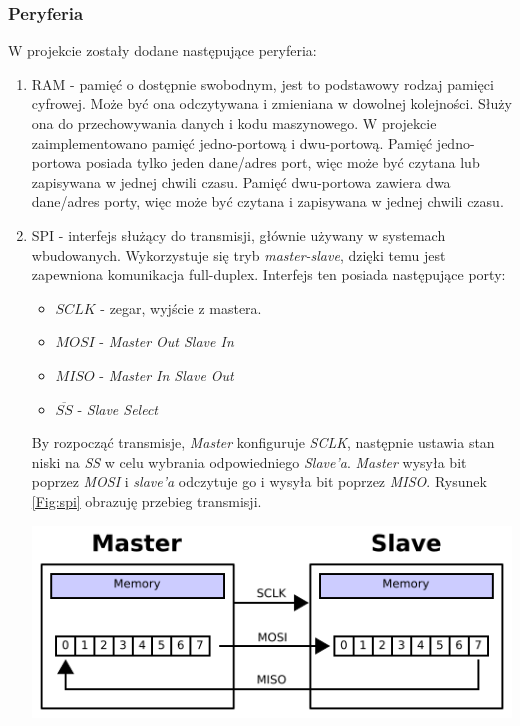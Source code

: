\documentclass[11pt,a4paper]{article}
\begin{document}
		\subsubsection{Peryferia}
		\hspace{5mm}
			W projekcie zostały dodane następujące peryferia:
			\begin{enumerate}
			\item RAM - pamięć o dostępnie swobodnym, jest to podstawowy rodzaj pamięci cyfrowej. Może być ona odczytywana i zmieniana w dowolnej kolejności. Służy ona do przechowywania danych i kodu maszynowego. W projekcie zaimplementowano pamięć jedno-portową i dwu-portową. Pamięć jedno-portowa posiada tylko jeden dane/adres port, więc może być czytana lub zapisywana w jednej chwili czasu. Pamięć dwu-portowa zawiera dwa dane/adres porty, więc może być czytana i zapisywana w jednej chwili czasu.\cite{ram_book}
			\item SPI - interfejs służący do transmisji, głównie używany w systemach wbudowanych. Wykorzystuje się tryb \textit{master-slave}, dzięki temu jest zapewniona komunikacja full-duplex. Interfejs ten posiada następujące porty:
			\begin{itemize}
			\item $SCLK$ - zegar, wyjście z mastera.
			\item $MOSI$ - \textit{Master Out Slave In}
			\item $MISO$ - \textit{Master In Slave Out}
			\item $\overline{SS}$ - \textit{Slave Select}
			\end{itemize}
			 By rozpocząć transmisje, \textit{Master} konfiguruje \textit{SCLK}, następnie ustawia stan niski na \textit{SS} w celu wybrania odpowiedniego \textit{Slave'a}. \textit{Master} wysyła bit poprzez \textit{MOSI} i \textit{slave'a} odczytuje go i wysyła bit poprzez \textit{MISO}. Rysunek \ref{Fig:spi} obrazuję przebieg transmisji\cite{spi_book}.\\
			\begin{minipage}{\textwidth}
				\begin{center}
					\includegraphics[width=13cm]{./rysunki/spi.png}
				\end{center}
			\end{minipage}
			

\end{enumerate}
\end{document}

